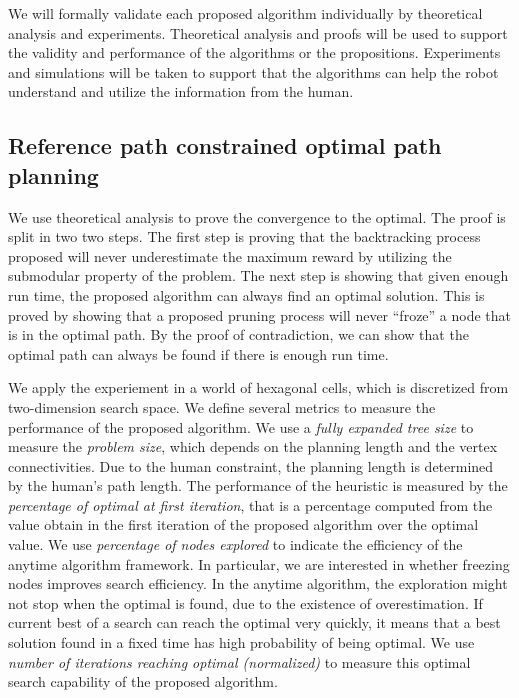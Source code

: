 \documentclass[phd]{byuprop}
\begin{document}
We will formally validate each proposed algorithm individually by theoretical analysis and experiments.
Theoretical analysis and proofs will be used to support the validity and performance of the algorithms or the propositions.
Experiments and simulations will be taken to support that the algorithms can help the robot understand and utilize the information from the human.

\subsection{Reference path constrained optimal path planning}

We use theoretical analysis to prove the convergence to the optimal.
The proof is split in two two steps.
The first step is proving that the backtracking process proposed will never underestimate the maximum reward by utilizing the submodular property of the problem.
The next step is showing that given enough run time, the proposed algorithm can always find an optimal solution.
This is proved by showing that a proposed pruning process will never ``froze'' a node that is in the optimal path.
By the proof of contradiction, we can show that the optimal path can always be found if there is enough run time.

We apply the experiement in a world of hexagonal cells, which is discretized from two-dimension search space.
We define several metrics to measure the performance of the proposed algorithm.
We use a \emph{fully expanded tree size} to measure the \emph{problem size}, which depends on the planning length and the vertex connectivities.
Due to the human constraint, the planning length is determined by the human's path length.
The performance of the heuristic is measured by the \emph{percentage of optimal at first iteration}, that is a percentage computed from the value obtain in the first iteration of the proposed algorithm over the optimal value.
We use \emph{percentage of nodes explored} to indicate the efficiency of the anytime algorithm framework.
In particular, we are interested in whether freezing nodes improves search efficiency.
In the anytime algorithm, the exploration might not stop when the optimal is found, due to the existence of overestimation.
If current best of a search can reach the optimal very quickly, it means that a best solution found in a fixed time has high probability of being optimal.
We use \emph{number of iterations reaching optimal (normalized)} to measure this optimal search capability of the proposed algorithm.
\end{document}
